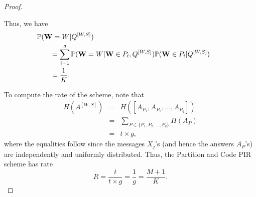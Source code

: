 \documentclass[letterpaper, 10 pt, conference]{ieeeconf}
\newtheorem{lemma}{Lemma}
\begin{document}
\begin{proof}
\begin{itemize}
\end{itemize}
Thus, we have 
\begin{eqnarray*}
\mathbb{P}(\mathbf{W} = W|Q^{[W,S]})\hspace{65mm} \\  = \sum_{i = 1 }^{g} \mathbb{P}(\mathbf{W} = W | \mathbf{W} \in P_i,Q^{[W,S]})\mathbb{P}(\mathbf{W} \in P_i | Q^{[W,S]})\hspace{7mm}\\ %
= \frac{1}{K}. \hspace{77mm}
\end{eqnarray*}

To compute the rate of the scheme, note that 
\begin{eqnarray*} 
H(A^{[W,S]}) &=& H([A_{P_1},A_{P_2},\dots,A_{P_{g}}]) \\ &=&\sum_{P\in \{P_1,P_2,\dots,P_{g}\}} H(A_{P}) \\ &=&  t\times g,
\end{eqnarray*} 
where the equalities follow since the messages $X_j$'s (and hence the answers $A_P$'s) are independently and uniformly distributed. %
Thus, the Partition and Code PIR scheme has rate $$R = \frac{t}{t\times g} = \frac{1}{g}=\frac{M+1}{K}.$$ 
\end{proof}




\end{document}
